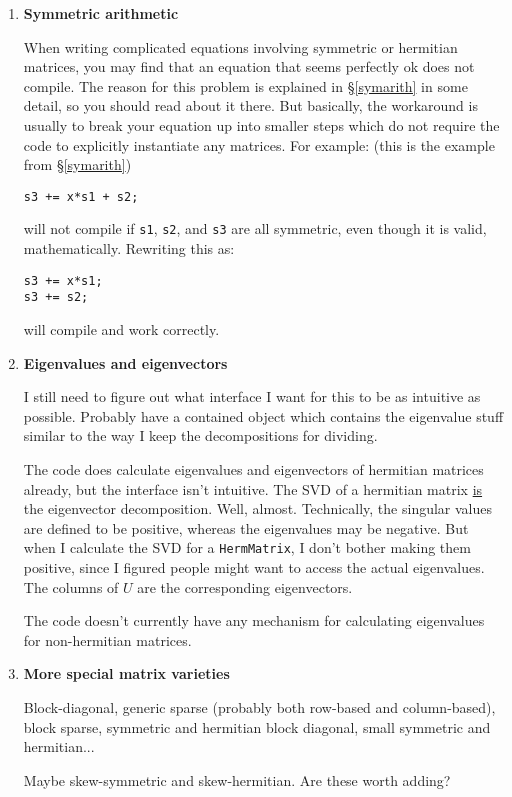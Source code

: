\documentclass[twoside,letterpaper,11pt]{article}
\renewcommand{\tt}[1]{{\texttt {#1}}}
\begin{document}
\begin{enumerate}
\item
\textbf{Symmetric arithmetic}

When writing complicated equations involving symmetric or hermitian matrices, 
you may find that an equation that seems perfectly ok does not compile.
The reason for this problem is explained in \S\ref{symarith} in some detail, 
so you should read about it there.  But basically, the workaround is usually
to break your equation up into smaller steps which do not require the code to 
explicitly instantiate any matrices.  For example: (this is the example from \S\ref{symarith})
\begin{verbatim}
s3 += x*s1 + s2;
\end{verbatim}
will not compile if \tt{s1}, \tt{s2}, and \tt{s3} are all symmetric, even though it is 
valid, mathematically.  Rewriting this as:
\begin{verbatim}
s3 += x*s1;
s3 += s2;
\end{verbatim}
will compile and work correctly.

\item
\textbf{Eigenvalues and eigenvectors}

I still need to figure out what interface I want for this to be as 
intuitive as possible.  Probably have a contained object which
contains the eigenvalue stuff similar to the way I keep
the decompositions for dividing.  

The code does calculate eigenvalues and eigenvectors
of hermitian matrices already, but the interface isn't intuitive.
The SVD of a hermitian matrix \underline{is} the 
eigenvector decomposition.  Well, almost.  Technically,
the singular values are defined to be positive, whereas the 
eigenvalues may be negative.  But when I calculate the SVD
for a \tt{HermMatrix},
I don't bother making them positive, since I figured people might
want to access the actual eigenvalues.  The columns of 
$U$ are the corresponding eigenvectors.

The code doesn't currently have any mechanism for calculating
eigenvalues for non-hermitian matrices.

\item
\textbf{More special matrix varieties}

Block-diagonal, generic sparse (probably both
row-based and column-based), block sparse, symmetric and hermitian block
diagonal, small symmetric and hermitian...

Maybe skew-symmetric and skew-hermitian.  Are these worth adding?


\end{enumerate}
\end{document}
